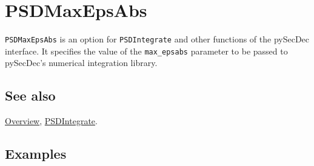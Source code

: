 \documentclass[../FeynHelpersManual.tex]{subfiles}
\begin{document}
\hypertarget{psdmaxepsabs}{
\section{PSDMaxEpsAbs}\label{psdmaxepsabs}}

\texttt{PSDMaxEpsAbs} is an option for \texttt{PSDIntegrate} and other
functions of the pySecDec interface. It specifies the value of the
\texttt{max_epsabs} parameter to be passed to pySecDec's numerical
integration library.

\subsection{See also}

\hyperlink{toc}{Overview}, \hyperlink{psdintegrate}{PSDIntegrate}.

\subsection{Examples}
\end{document}
